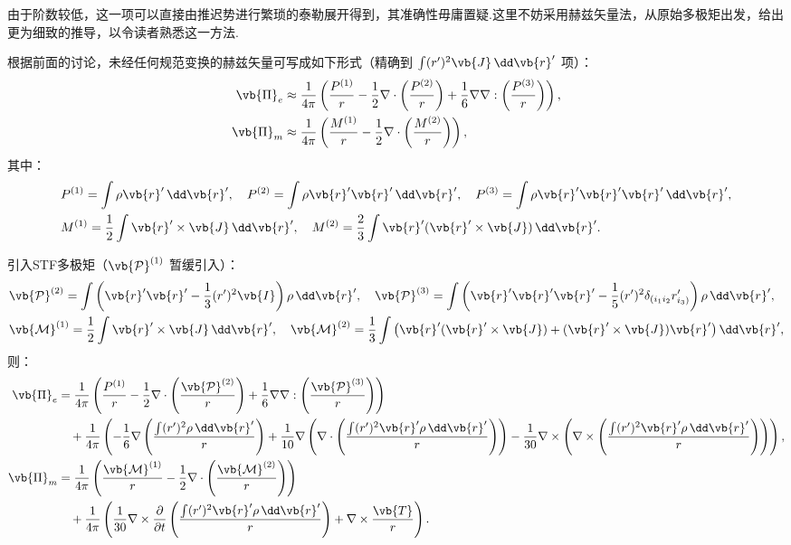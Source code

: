 由于阶数较低，这一项可以直接由推迟势进行繁琐的泰勒展开得到，其准确性毋庸置疑.这里不妨采用赫兹矢量法，从原始多极矩出发，给出更为细致的推导，以令读者熟悉这一方法.

根据前面的讨论，未经任何规范变换的赫兹矢量可写成如下形式（精确到 \(\int (r')^2 \vb{J} \, \dd \vb{r}'\) 项）：
\begin{align*}
	\vb{\Pi}_e &\approx \frac{1}{4\pi} \left( \frac{P^{(1)}}{r} - \frac{1}{2} \nabla \cdot \left( \frac{P^{(2)}}{r} \right) + \frac{1}{6} \nabla \nabla : \left( \frac{P^{(3)}}{r} \right) \right), \\
	\vb{\Pi}_m &\approx \frac{1}{4\pi} \left( \frac{M^{(1)}}{r} - \frac{1}{2} \nabla \cdot \left( \frac{M^{(2)}}{r} \right) \right),
\end{align*}
其中：
\begin{align*}
	&P^{(1)} = \int \rho \vb{r}' \, \dd \vb{r}', \quad P^{(2)} = \int \rho \vb{r}' \vb{r}' \, \dd \vb{r}', \quad P^{(3)} = \int \rho \vb{r}' \vb{r}' \vb{r}' \, \dd \vb{r}', \\
	&M^{(1)} = \frac{1}{2} \int \vb{r}' \times \vb{J} \, \dd \vb{r}', \quad M^{(2)} = \frac{2}{3} \int \vb{r}' (\vb{r}' \times \vb{J}) \, \dd \vb{r}'.
\end{align*}

引入STF多极矩（\(\vb{\mathcal{P}}^{(1)}\) 暂缓引入）：
\begin{align*}
	&\vb{\mathcal{P}}^{(2)} = \int \left( \vb{r}' \vb{r}' - \frac{1}{3} (r')^2 \vb{I} \right) \rho \, \dd \vb{r}', \quad
	\vb{\mathcal{P}}^{(3)} = \int \left( \vb{r}' \vb{r}' \vb{r}' - \frac{1}{5} (r')^2 \delta_{(i_1 i_2} r'_{i_3)} \right) \rho \, \dd \vb{r}', \\
	&\vb{\mathcal{M}}^{(1)} = \frac{1}{2} \int \vb{r}' \times \vb{J} \, \dd \vb{r}', \quad     \vb{\mathcal{M}}^{(2)} = \frac{1}{3} \int \left( \vb{r}' (\vb{r}' \times \vb{J}) + (\vb{r}' \times \vb{J}) \vb{r}' \right) \dd \vb{r}',
\end{align*}
则：
\begin{align*}
	\vb{\Pi}_e &= \frac{1}{4\pi} \left( \frac{P^{(1)}}{r} - \frac{1}{2} \nabla \cdot \left( \frac{\vb{\mathcal{P}}^{(2)}}{r} \right) + \frac{1}{6} \nabla \nabla : \left( \frac{\vb{\mathcal{P}}^{(3)}}{r} \right) \right) \\
	&\quad + \frac{1}{4\pi} \left( -\frac{1}{6} \nabla \left( \frac{\int (r')^2 \rho \, \dd \vb{r}'}{r} \right) + \frac{1}{10} \nabla \left( \nabla \cdot \left( \frac{\int (r')^2 \vb{r}' \rho \, \dd \vb{r}'}{r} \right) \right) - \frac{1}{30} \nabla \times \left( \nabla \times \left( \frac{\int (r')^2 \vb{r}' \rho \, \dd \vb{r}'}{r} \right) \right) \right), \\
	\vb{\Pi}_m &= \frac{1}{4\pi} \left( \frac{\vb{\mathcal{M}}^{(1)}}{r} - \frac{1}{2} \nabla \cdot \left( \frac{\vb{\mathcal{M}}^{(2)}}{r} \right) \right) \\
	&\quad + \frac{1}{4\pi} \left( \frac{1}{30} \nabla \times \frac{\partial}{\partial t} \left( \frac{\int (r')^2 \vb{r}' \rho \, \dd \vb{r}'}{r} \right) + \nabla \times \frac{\vb{T}}{r} \right).
\end{align*}

